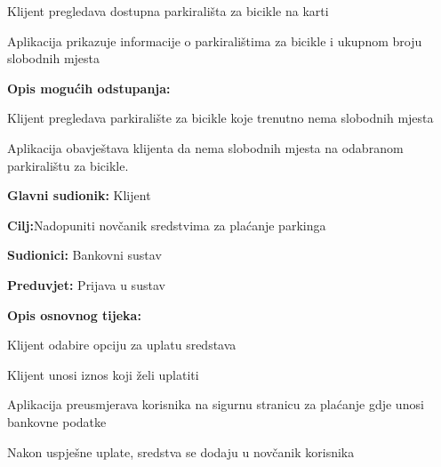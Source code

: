{\begin{packed_item}
	\item[] \begin{packed_enum}
		
		\item Klijent pregledava dostupna parkirališta za bicikle na karti
		\item Aplikacija prikazuje informacije o parkiralištima za bicikle i ukupnom broju slobodnih mjesta
		
	\end{packed_enum}
	
	\item  \textbf{Opis mogućih odstupanja:}
	
	\item[] \begin{packed_item}
		
		\item[2.a] Klijent pregledava parkiralište za bicikle koje trenutno nema slobodnih mjesta
		\item[] \begin{packed_enum}
			
			\item Aplikacija obavještava klijenta da nema slobodnih mjesta na odabranom parkiralištu za bicikle.
			
		\end{packed_enum}
		
	\end{packed_item}
	
\end{packed_item}

\noindent {}
\begin{packed_item}
	
	\item \textbf{Glavni sudionik: }Klijent
	\item  \textbf{Cilj:}Nadopuniti novčanik sredstvima za plaćanje parkinga
	\item  \textbf{Sudionici:} Bankovni sustav
	\item  \textbf{Preduvjet:} Prijava u sustav
	\item  \textbf{Opis osnovnog tijeka:}
	
	\item[] \begin{packed_enum}
		
		\item Klijent odabire opciju za uplatu sredstava
		\item Klijent unosi iznos koji želi uplatiti
		\item Aplikacija preusmjerava korisnika na sigurnu stranicu za plaćanje gdje unosi bankovne podatke
		\item Nakon uspješne uplate, sredstva se dodaju u novčanik korisnika
		

\end{packed_enum}
\end{packed_item}}

